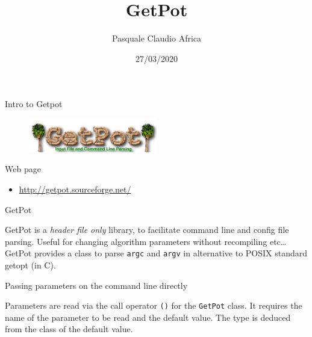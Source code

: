 \documentclass[10pt]{beamer}
\begin{document}
    \title{GetPot}
    \author{Pasquale Claudio Africa}
    \date{27/03/2020}

\begin{frame}
    \maketitle
\end{frame}

\begin{frame}{Intro to Getpot}
    \begin{figure}
        \centering
        \includegraphics[width=0.5\textwidth]{images/GetPot_logo.jpg}
    \end{figure}

    \begin{block}{Web page}
        \centering
        \begin{itemize}
            \item \url{http://getpot.sourceforge.net/}
        \end{itemize}
    \end{block}

\end{frame}


\begin{frame}{GetPot}

    GetPot is a \emph{header file only} library,
    to facilitate command line and config file parsing.
    Useful for changing algorithm parameters without recompiling
     etc\ldots\\[1cm]

    GetPot provides a class to parse \texttt{argc} and \texttt{argv} in alternative to POSIX standard getopt (in C).

\end{frame}


\begin{frame}[fragile]{Passing parameters on the command line directly}

    

    Parameters are read via the call operator \texttt{()} for the \texttt{GetPot} class.
    It requires the name of the parameter to be read and the default value.
    The type is deduced from the class of the default value.

\end{frame}
\end{document}
